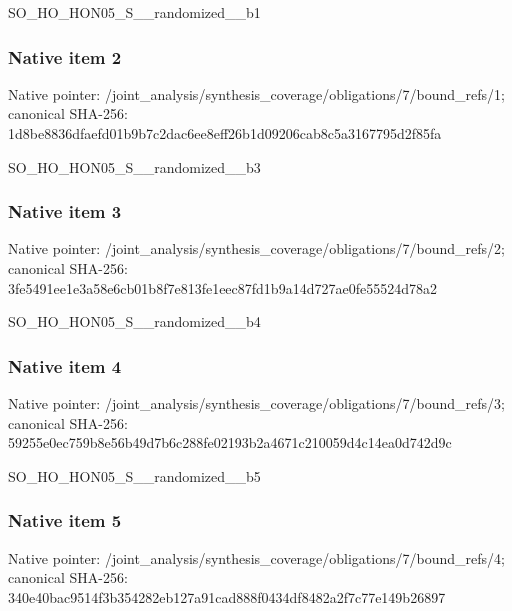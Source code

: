 \documentclass[10pt,a4paper]{article}
\begin{document}
\begingroup\raggedright\sloppy SO\_\allowbreak{}HO\_\allowbreak{}HON05\_\allowbreak{}S\_\allowbreak{}\_\allowbreak{}randomized\_\allowbreak{}\_\allowbreak{}b1\par\endgroup

\subsubsection{Native item 2}
Native pointer: /joint\_\allowbreak{}analysis/synthesis\_\allowbreak{}coverage/obligations/7/bound\_\allowbreak{}refs/1; canonical SHA-256: 1d8be8836dfaefd01b9b7c2dac6ee8eff26b1d09206cab8c5a3167795d2f85fa

\begingroup\raggedright\sloppy SO\_\allowbreak{}HO\_\allowbreak{}HON05\_\allowbreak{}S\_\allowbreak{}\_\allowbreak{}randomized\_\allowbreak{}\_\allowbreak{}b3\par\endgroup

\subsubsection{Native item 3}
Native pointer: /joint\_\allowbreak{}analysis/synthesis\_\allowbreak{}coverage/obligations/7/bound\_\allowbreak{}refs/2; canonical SHA-256: 3fe5491ee1e3a58e6cb01b8f7e813fe1eec87fd1b9a14d727ae0fe55524d78a2

\begingroup\raggedright\sloppy SO\_\allowbreak{}HO\_\allowbreak{}HON05\_\allowbreak{}S\_\allowbreak{}\_\allowbreak{}randomized\_\allowbreak{}\_\allowbreak{}b4\par\endgroup

\subsubsection{Native item 4}
Native pointer: /joint\_\allowbreak{}analysis/synthesis\_\allowbreak{}coverage/obligations/7/bound\_\allowbreak{}refs/3; canonical SHA-256: 59255e0ec759b8e56b49d7b6c288fe02193b2a4671c210059d4c14ea0d742d9c

\begingroup\raggedright\sloppy SO\_\allowbreak{}HO\_\allowbreak{}HON05\_\allowbreak{}S\_\allowbreak{}\_\allowbreak{}randomized\_\allowbreak{}\_\allowbreak{}b5\par\endgroup

\subsubsection{Native item 5}
Native pointer: /joint\_\allowbreak{}analysis/synthesis\_\allowbreak{}coverage/obligations/7/bound\_\allowbreak{}refs/4; canonical SHA-256: 340e40bac9514f3b354282eb127a91cad888f0434df8482a2f7c77e149b26897
\end{document}
